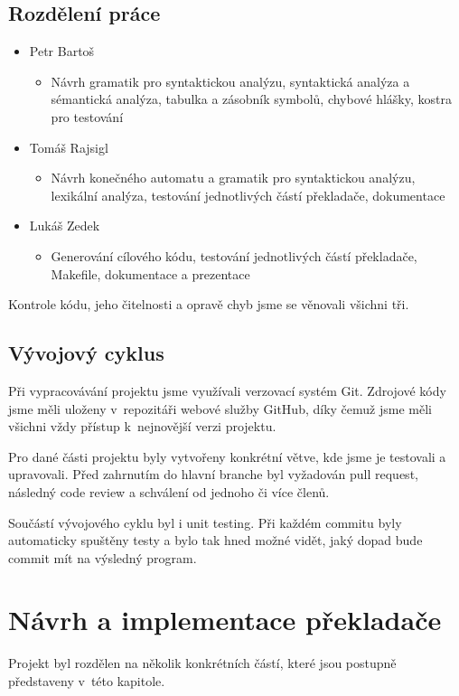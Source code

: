 \documentclass[a4paper,12pt]{article}
\begin{document}
\subsection{Rozdělení práce}

\begin{itemize}
	\item Petr Bartoš
	      \begin{itemize}
	      	\item Návrh gramatik pro syntaktickou analýzu, syntaktická analýza a  sémantická analýza, tabulka a zásobník symbolů,  chybové hlášky, kostra pro testování
	      \end{itemize}
	\item Tomáš Rajsigl 
	      \begin{itemize}
	      	\item Návrh konečného automatu a gramatik pro syntaktickou analýzu, lexikální analýza, testování jednotlivých částí překladače, dokumentace
	      \end{itemize}
	\item Lukáš Zedek
	      \begin{itemize}
	      	\item Generování cílového kódu, testování jednotlivých částí překladače, Makefile, dokumentace a prezentace
	      \end{itemize}
\end{itemize}
Kontrole kódu, jeho čitelnosti a opravě chyb jsme se věnovali všichni tři.
\subsection{Vývojový cyklus}
Při vypracovávání projektu jsme využívali verzovací systém Git. Zdrojové kódy jsme měli uloženy v~repozitáři webové služby GitHub, díky čemuž jsme měli všichni vždy přístup k~nejnovější verzi projektu. 

Pro dané části projektu byly vytvořeny konkrétní větve, kde jsme je testovali a upravovali. Před zahrnutím do hlavní branche byl vyžadován pull request, následný code review a schválení od jednoho či více členů. 

Součástí vývojového cyklu byl i unit testing. Při každém commitu byly automaticky spuštěny testy a bylo tak hned možné vidět, jaký dopad bude commit mít na výsledný program.
\clearpage

\section{Návrh a implementace překladače}
Projekt byl rozdělen na několik konkrétních částí, které jsou postupně představeny v~této kapitole.
\end{document}
